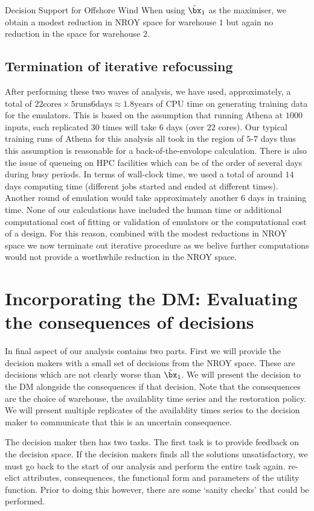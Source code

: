 \begin{chapter}{Decision Support for Offshore Wind \label{Ch:ds-for-ow}}
When using $\hat{\bx}_1$ as the maximiser, we obtain a modest reduction in NROY space for warehouse $1$ but again no reduction in the space for warehouse $2$.
\subsection{Termination of iterative refocussing}

After performing these two waves of analysis, we have used, approximately, a total of $22 \text{cores} \times 5 \text{runs} 6 \text{days} \approx 1.8 \text{years}$ of CPU time on generating training data for the emulators. This is based on the assumption that running Athena at $1000$ inputs, each replicated $30$ times will take $6$ days (over $22$ cores). Our typical training runs of Athena for this analysis all took in the region of $5$-$7$ days thus this assumption is reasonable for a back-of-the-envolope calculation. There is also the issue of queueing on HPC facilities which can be of the order of several days during busy periods. In terms of wall-clock time, we used a total of around $14$ days computing time (different jobs started and ended at different times). Another round of emulation would take approximately another $6$ days in training time. None of our calculations have included the human time or additional computational cost of fitting or validation of emulators or the computational cost of a design. For this reason, combined with the modest reductions in NROY space we now terminate out iterative procedure as we belive further computations would not provide a worthwhile reduction in the NROY space.

\section{Incorporating the DM: Evaluating the consequences of decisions}

In final aspect of our analysis contains two parts. First we will provide the decision makers with a small set of decisions from the NROY space. These are decisions which are not clearly worse than $\hat{\bx}_1$. We will present the decision to the DM alongside the consequences if that decision. Note that the consequences are the choice of warehouse, the availablity time series and the restoration policy. We will present multiple replicates of the availablity  times series to the decision maker to communicate that this is an uncertain consequence.

The decision maker then has two tasks. The first task is to provide feedback on the decision space. If the decision makers finds all the solutions unsatisfactory, we must go back to the start of our analysis and perform the entire task again. re-elict attributes, consequences, the functional form and parameters of the utility function. Prior to doing this however, there are some `sanity checks' that could be performed.


\end{chapter}
